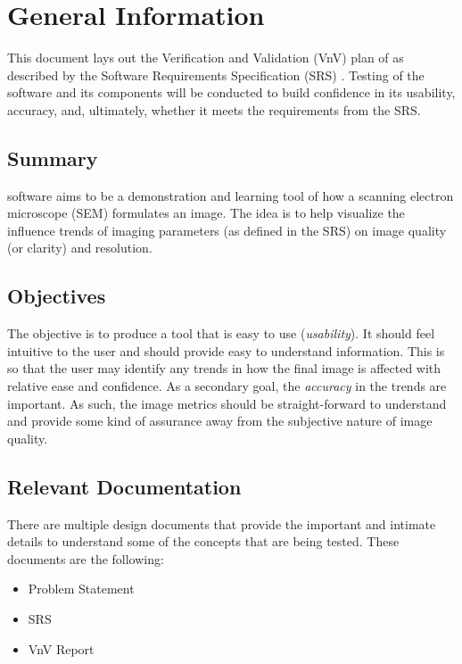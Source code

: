 \documentclass[12pt, titlepage]{article}
\begin{document}
\newpage


\section{General Information}

This document lays out the Verification and Validation (VnV) plan of \progname{}
as described by the Software Requirements Specification (SRS) 
\citep{SRS}. Testing of the software and its components will be conducted to build confidence in 
its usability, accuracy, and, ultimately, whether it meets the requirements from the SRS.

\subsection{Summary}

\progname{} software aims to be a demonstration and learning tool of how a scanning electron 
microscope (SEM) formulates an image. The idea is to help visualize the influence trends of imaging 
parameters (as defined in the SRS) on image quality (or clarity) and resolution.


\subsection{Objectives} \label{sec_objectives}

The objective is to produce a tool that is easy to use (\textit{usability}). It should feel intuitive 
to the user and should provide easy to understand information. This is so that the user may 
identify any trends in how the final image is affected with relative ease and confidence. As a 
secondary goal, the \textit{accuracy} in the trends are important. As such, the image metrics 
should be straight-forward to understand and provide some kind of assurance away from the 
subjective nature of image quality.

\subsection{Relevant Documentation}

There are multiple design documents that provide the important and intimate details to understand 
some of the concepts that are being tested. These documents are the following:

\begin{itemize}
  \item Problem Statement \citep{Prob_Statement}
  \item SRS \citep{SRS}
  \item VnV Report \citep{VnV_report}
\end{itemize}
\end{document}
